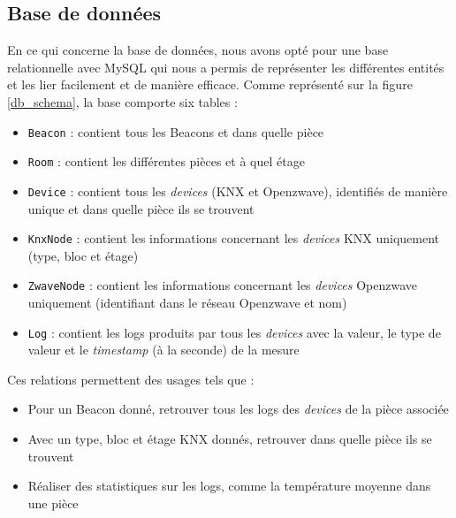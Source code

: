 \subsection{Base de données}
En ce qui concerne la base de données, nous avons opté pour une base relationnelle avec MySQL \cite{mysql} qui nous a permis de représenter les différentes entités et les lier facilement et de manière efficace. Comme représenté sur la figure \ref{db_schema}, la base comporte six tables :
\begin{itemize}
    \item \texttt{Beacon} : contient tous les Beacons et dans quelle pièce
    \item \texttt{Room} : contient les différentes pièces et à quel étage
    \item \texttt{Device} : contient tous les \textit{devices} (KNX et Openzwave), identifiés de manière unique et dans quelle pièce ils se trouvent
    \item \texttt{KnxNode} : contient les informations concernant les \textit{devices} KNX uniquement (type, bloc et étage)
    \item \texttt{ZwaveNode} : contient les informations concernant les \textit{devices} Openzwave uniquement (identifiant dans le réseau Openzwave et nom)
    \item \texttt{Log} : contient les logs produits par tous les \textit{devices} avec la valeur, le type de valeur et le \textit{timestamp} (à la seconde) de la mesure
\end{itemize}
Ces relations permettent des usages tels que :
\begin{itemize}
    \item Pour un Beacon donné, retrouver tous les logs des \textit{devices} de la pièce associée
    \item Avec un type, bloc et étage KNX donnés, retrouver dans quelle pièce ils se trouvent
    \item Réaliser des statistiques sur les logs, comme la température moyenne dans une pièce
\end{itemize}

